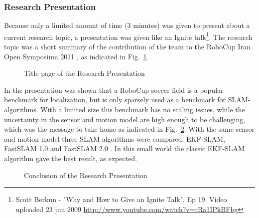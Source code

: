 \documentclass[11pt,a4paper,oneside]{article}
\begin{document}
\subsubsection{Research Presentation}
Because only a limited amount of time (3 minutes) was given to present about a current research topic, a presentation was given like an Ignite talk\footnote{Scott Berkun - "Why and How to Give an Ignite Talk", Ep 19. Video uploaded 23 jun 2009 \url{http://www.youtube.com/watch?v=rRa1IPkBFbg}}. 
The research topic was a short summary of the contribution of the team to the RoboCup Iran Open Symposium 2011 \cite{Visser2011rios}, as indicated in Fig.~\ref{fig:TitlePresentation}.

\begin{figure}[htb]
\centering
{}
\caption{Title page of the Research Presentation}
\label{fig:TitlePresentation}
\end{figure}

In the presentation was shown that a RoboCup soccer field is a popular benchmark for localization, but is only sparsely used as a benchmark for SLAM-algorithms. 
With a limited size this benchmark has no scaling issues, while the uncertainty in the sensor and motion model are high enough to be challenging, which was the message to take home as indicated in Fig.~\ref{fig:ConclusionPresentation}. With the same sensor and  motion model three SLAM algorithms were compared: EKF-SLAM, FastSLAM 1.0 and FastSLAM 2.0 \cite{Thrun2005}. In this small world the classic EKF-SLAM algorithm gave the best result, as expected.

\begin{figure}[htb]    	
\centering
{}
\caption{Conclusion of the Research Presentation}
\label{fig:ConclusionPresentation}
\end{figure}
\newpage
\end{document}
